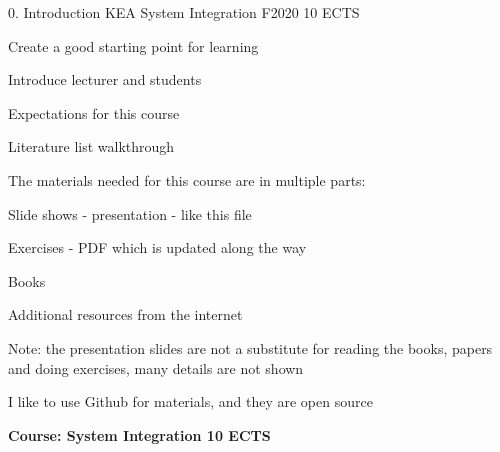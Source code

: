 \documentclass[Screen16to9,17pt]{foils}
\begin{document}
\mytitlepage
{0. Introduction}
{KEA System Integration F2020 10 ECTS}

\hlkprofilkea


\begin{list2}
\item Create a good starting point for learning
\item Introduce lecturer and students
\item Expectations for this course
\item Literature list walkthrough
\end{list2}



\begin{list1}
\item The materials needed for this course are in multiple parts:
\begin{list2}
\item Slide shows - presentation - like this file
\item Exercises - PDF which is updated along the way
\item Books
\item Additional resources from the internet
\end{list2}
\item Note: the presentation slides are not a substitute for reading the books, papers\\ and doing exercises, many details are not shown
\end{list1}

\vskip 1cm

\centerline{I like to use Github for materials, and they are open source}





{\Large\bf Course: System Integration 10 ECTS}
\end{document}
